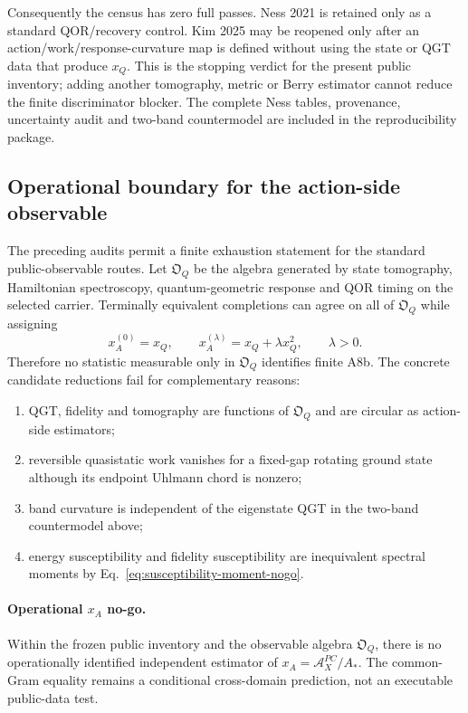 Consequently the census has zero full passes.  Ness 2021 is retained only as
a standard QOR/recovery control.  Kim 2025 may be reopened only after an
action/work/response-curvature map is defined without using the state or QGT
data that produce $x_Q$.  This is the stopping verdict for the present public
inventory; adding another tomography, metric or Berry estimator cannot
reduce the finite discriminator blocker.  The complete Ness tables, provenance,
uncertainty audit and two-band countermodel are included in the reproducibility
package.

\subsection{Operational boundary for the action-side observable}

The preceding audits permit a finite exhaustion statement for the standard
public-observable routes.  Let $\mathfrak O_Q$ be the algebra generated by
state tomography, Hamiltonian spectroscopy, quantum-geometric response and
QOR timing on the selected carrier.  Terminally equivalent completions can
agree on all of $\mathfrak O_Q$ while assigning
\begin{equation}
 x_A^{(0)}=x_Q,
 \qquad
 x_A^{(\lambda)}=x_Q+\lambda x_Q^2,
 \qquad \lambda>0.
 \label{eq:terminal-equivalent-actions}
\end{equation}
Therefore no statistic measurable only in $\mathfrak O_Q$ identifies finite
A8b.  The concrete candidate reductions fail for complementary reasons:
\begin{enumerate}[label=(O\arabic*)]
\item QGT, fidelity and tomography are functions of $\mathfrak O_Q$ and are
  circular as action-side estimators;
\item reversible quasistatic work vanishes for a fixed-gap rotating ground
  state although its endpoint Uhlmann chord is nonzero;
\item band curvature is independent of the eigenstate QGT in the two-band
  countermodel above;
\item energy susceptibility and fidelity susceptibility are inequivalent
  spectral moments by Eq.~\eqref{eq:susceptibility-moment-nogo}.
\end{enumerate}

\paragraph{Operational $x_A$ no-go.}
Within the frozen public inventory and the observable algebra
$\mathfrak O_Q$, there is no operationally identified independent estimator
of $x_A=\mathcal A_X^{PC}/A_*$.  The common-Gram equality remains a conditional
cross-domain prediction, not an executable public-data test.

